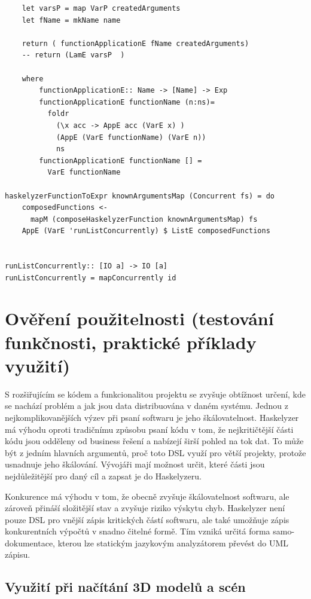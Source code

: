 \documentclass[male,czech]{kithesis}
\begin{document}
\begin{verbatim}
    let varsP = map VarP createdArguments 
    let fName = mkName name

    return ( functionApplicationE fName createdArguments)
    -- return (LamE varsP  )

    where
        functionApplicationE:: Name -> [Name] -> Exp
        functionApplicationE functionName (n:ns)= 
          foldr 
            (\x acc -> AppE acc (VarE x) ) 
            (AppE (VarE functionName) (VarE n)) 
            ns
        functionApplicationE functionName [] = 
          VarE functionName

haskelyzerFunctionToExpr knownArgumentsMap (Concurrent fs) = do
    composedFunctions <- 
      mapM (composeHaskelyzerFunction knownArgumentsMap) fs
    AppE (VarE 'runListConcurrently) $ ListE composedFunctions


runListConcurrently:: [IO a] -> IO [a]
runListConcurrently = mapConcurrently id

\end{verbatim}


\chapter{Ověření použitelnosti (testování funkčnosti, praktické příklady využití)}

S rozšiřujícím se kódem a funkcionalitou projektu se zvyšuje obtížnost určení, 
kde se nachází problém a jak jsou data distribuována v daném systému. 
Jednou z nejkomplikovanějších výzev při psaní softwaru je jeho škálovatelnost. 
Haskelyzer má výhodu oproti tradičnímu způsobu psaní kódu v tom, 
že nejkritičtější části kódu jsou odděleny od business řešení a nabízejí širší pohled na tok dat. 
To může být z jedním hlavních argumentů, proč toto DSL využí pro větší projekty,
protože usnadnuje jeho škálování.
Vývojáři mají možnost určit, které části jsou nejdůležitější pro daný cíl a zapsat je do Haskelyzeru.

Konkurence má výhodu v tom, že obecně zvyšuje škálovatelnost softwaru, 
ale zároveň přináší složitější stav a zvyšuje riziko výskytu chyb. 
Haskelyzer není pouze DSL pro vnější zápis kritických částí softwaru, 
ale také umožňuje zápis konkurentních výpočtů v snadno čitelné formě. 
Tím vzniká určitá forma samo-dokumentace, 
kterou lze statickým jazykovým analyzátorem převést do UML zápisu.

\section{Využití při načítání 3D modelů a scén}
\end{document}
